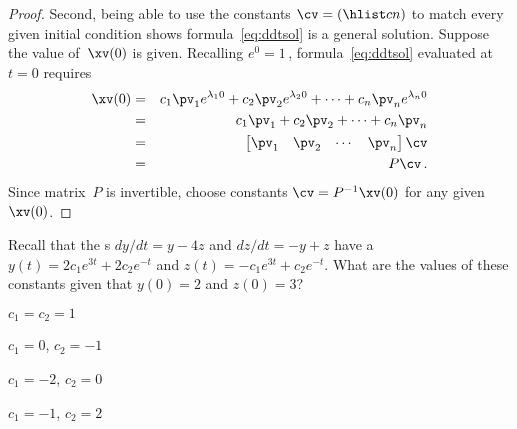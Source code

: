 \begin{proof}
\begin{comment}
Straightforward substitution is simpler, but the above reinforces the simplification through diagonalisation.
\end{comment}

Second, being able to use the constants \(\cv=(\hlist cn)\) to match every given initial condition shows formula~\eqref{eq:ddtsol} is a general solution.
Suppose the value of~\(\xv(0)\) is given.
Recalling \(e^0=1\)\,, formula~\eqref{eq:ddtsol} evaluated at \(t=0\)  requires
\begin{eqnarray*}
\xv(0)&=&c_1\pv_1e^{\lambda_10}+c_2\pv_2e^{\lambda_20}+\cdots+c_n\pv_ne^{\lambda_n0}
\\&=&c_1\pv_1+c_2\pv_2+\cdots+c_n\pv_n
\\&=&\begin{bmatrix} \pv_1&\pv_2&\cdots&\pv_n \end{bmatrix}\cv
\\&=&P\cv\,.
\end{eqnarray*}
Since matrix~\(P\) is invertible, choose constants \(\cv=P^{-1}\xv(0)\) for any given~\(\xv(0)\).
\end{proof}





\begin{activity}
Recall that the s \(dy/dt=y-4z\) and \(dz/dt=-y+z\) have a  \(y(t)=2c_1e^{3t}+2c_2e^{-t}\) and \(z(t)=-c_1e^{3t}+c_2e^{-t}\).
What are the values of these constants given that \(y(0)=2\) and \(z(0)=3\)?
\begin{parts}
\item \(c_1=c_2=1\)
\item \(c_1=0\), \(c_2=-1\)
\item \(c_1=-2\), \(c_2=0\)
\item\actans \(c_1=-1\), \(c_2=2\)
\end{parts}
\end{activity}




